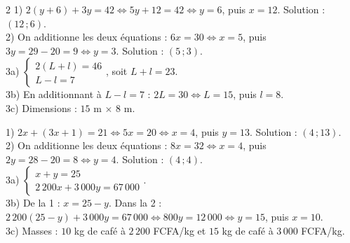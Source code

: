 \begin{multicols}{2}
1) $2(y+6)+3y=42\iff5y+12=42\iff y=6$, puis $x=12$. Solution : $(12\,;6)$.\\
2) On additionne les deux équations : $6x=30\iff x=5$, puis $3y=29-20=9\iff y=3$. Solution :
$(5\,;3)$.\\
3a) $\left\{\begin{array}{l}2(L+l)=46\\L-l=7\end{array}\right.$, soit $L+l=23$.\\
3b) En additionnant à $L-l=7$ : $2L=30\iff L=15$, puis $l=8$.\\
3c) Dimensions : $15$ m $\times$ $8$ m.

1) $2x+(3x+1)=21\iff5x=20\iff x=4$, puis $y=13$. Solution : $(4\,;13)$.\\
2) On additionne les deux équations : $8x=32\iff x=4$, puis $2y=28-20=8\iff y=4$. Solution :
$(4\,;4)$.\\
3a) $\left\{\begin{array}{l}x+y=25\\2\,200x+3\,000y=67\,000\end{array}\right.$.\\
3b) De la 1\iere{} : $x=25-y$. Dans la 2\ieme{} :
$2\,200(25-y)+3\,000y=67\,000\iff800y=12\,000\iff y=15$, puis $x=10$.\\
3c) Masses : $10$ kg de café à $2\,200$ FCFA/kg et $15$ kg de café à $3\,000$ FCFA/kg.

\end{multicols}
\exercicesBanner
